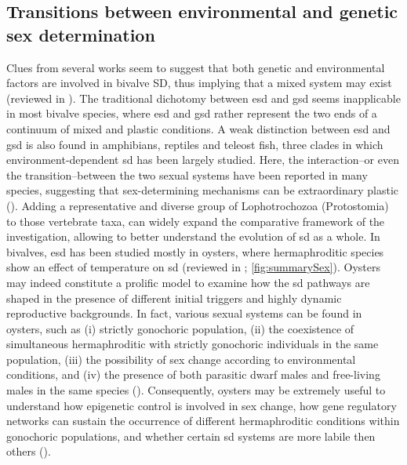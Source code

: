 \subsection{Transitions between environmental and genetic sex determination}
Clues from several works seem to suggest that both genetic and environmental factors are involved in bivalve SD, thus implying that a mixed system may exist (reviewed in ). The traditional dichotomy between \gls{esd} and \gls{gsd} seems inapplicable in most bivalve species, where \gls{esd} and \gls{gsd} rather represent the two ends of a continuum of mixed and plastic conditions.  A weak distinction between \gls{esd} and \gls{gsd} is also found in amphibians, reptiles and teleost fish, three clades in which environment-dependent \gls{sd} has been largely studied. Here, the interaction–or even the transition–between the two sexual systems have been reported in many species, suggesting that sex-determining mechanisms can be extraordinary plastic (). Adding a representative and diverse group of Lophotrochozoa (Protostomia) to those vertebrate taxa, can widely expand the comparative framework of the investigation, allowing to better understand the evolution of \gls{sd} as a whole. In bivalves, \gls{esd} has been studied mostly in oysters, where hermaphroditic species show an effect of temperature on \gls{sd} (reviewed in ; \cref{fig:summarySex}). Oysters may indeed constitute a prolific model to examine how the \gls{sd} pathways are shaped in the presence of different initial triggers and highly dynamic reproductive backgrounds. In fact, various sexual systems can be found in oysters, such as (i) strictly gonochoric population, (ii) the coexistence of simultaneous hermaphroditic with strictly gonochoric individuals in the same population, (iii) the possibility of sex change according to environmental conditions, and (iv) the presence of both parasitic dwarf males and free-living males in the same species (). Consequently, oysters may be extremely useful to understand how epigenetic control is involved in sex change, how gene regulatory networks can sustain the occurrence of different hermaphroditic conditions within gonochoric populations, and whether certain \gls{sd} systems are more labile then others ().

